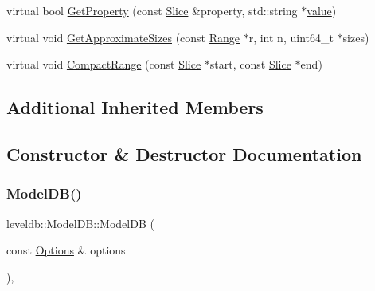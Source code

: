 \begin{DoxyCompactItemize}
\item 
virtual bool \mbox{\hyperlink{classleveldb_1_1_model_d_b_a5c83a50a08e45c2564c39a650ea55b86}{Get\+Property}} (const \mbox{\hyperlink{classleveldb_1_1_slice}{Slice}} \&property, std\+::string $\ast$\mbox{\hyperlink{version__set_8cc_a38c8b88c432e666ad10b0c5573e1160a}{value}})
\item 
virtual void \mbox{\hyperlink{classleveldb_1_1_model_d_b_aeb5502077fae602c5ca3c1153f29b693}{Get\+Approximate\+Sizes}} (const \mbox{\hyperlink{structleveldb_1_1_range}{Range}} $\ast$r, int n, uint64\+\_\+t $\ast$sizes)
\item 
virtual void \mbox{\hyperlink{classleveldb_1_1_model_d_b_a7a04a6e5227079f861c26b920df6b833}{Compact\+Range}} (const \mbox{\hyperlink{classleveldb_1_1_slice}{Slice}} $\ast$start, const \mbox{\hyperlink{classleveldb_1_1_slice}{Slice}} $\ast$end)
\end{DoxyCompactItemize}
\subsection*{Additional Inherited Members}


\subsection{Constructor \& Destructor Documentation}
\mbox{\label{classleveldb_1_1_model_d_b_ac0117ce964631ff7977b465de053a282}} 
\subsubsection{\texorpdfstring{ModelDB()}{ModelDB()}}
{\footnotesize\ttfamily leveldb\+::\+Model\+D\+B\+::\+Model\+DB (\begin{DoxyParamCaption}\item[{const \mbox{\hyperlink{structleveldb_1_1_options}{Options}} \&}]{options }\end{DoxyParamCaption})\hspace{0.3cm}{\ttfamily [inline]}, {\ttfamily [explicit]}}

\mbox{\label{classleveldb_1_1_model_d_b_a35e9042c7ed06e8324d5e40318771825}} 
